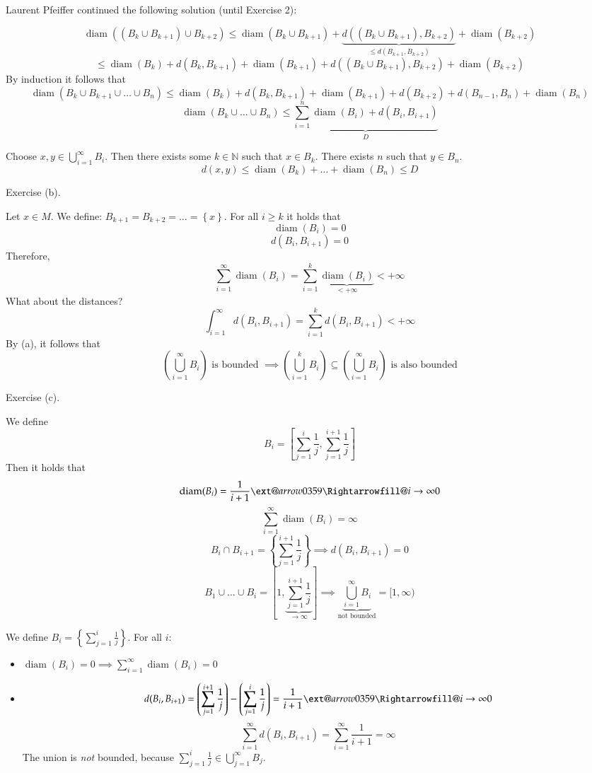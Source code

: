 \documentclass{article}
\makeatletter
\newcommand{\set}[1]{\left\{#1\right\}}
\newcommand{\xRightarrow}[2][]{\ext@arrow 0359\Rightarrowfill@{#1}{#2}}
\makeatother
\begin{document}
Laurent Pfeiffer continued the following solution (until Exercise 2):

\[ \operatorname{diam}((B_k \cup B_{k+1}) \cup B_{k+2}) \leq \operatorname{diam}(B_k \cup B_{k+1}) + \underbrace{d((B_k \cup B_{k+1}), B_{k+2})}_{\leq d(B_{k+1}, B_{k+2})} + \operatorname{diam}(B_{k+2}) \]
\[ \leq \operatorname{diam}(B_k) + d(B_k, B_{k+1}) + \operatorname{diam}(B_{k+1}) + d((B_k \cup B_{k+1}), B_{k+2}) + \operatorname{diam}(B_{k+2}) \]
By induction it follows that
\[ \operatorname{diam}(B_k \cup B_{k+1} \cup \dots \cup B_n) \leq \operatorname{diam}(B_k) + d(B_k, B_{k+1}) + \operatorname{diam}(B_{k+1})  + d(B_{k+2}) + d(B_{n-1}, B_n) + \operatorname{diam}(B_n) \]
\[ \operatorname{diam}(B_k \cup \dots \cup B_n) \leq \underbrace{\sum_{i=1}^n \operatorname{diam}(B_i) + d(B_i, B_{i+1})}_{D} \]

Choose $x,y \in \bigcup_{i=1}^\infty B_i$. Then there exists some $k \in \mathbb N$ such that $x \in B_k$. There exists $n$ such that $y \in B_n$.
\[ d(x,y) \leq \operatorname{diam}(B_k) + \dots + \operatorname{diam}(B_n) \leq D \]

Exercise (b).

Let $x \in M$. We define: $B_{k+1} = B_{k+2} = \dots = \set{x}$.
For all $i \geq k$ it holds that
\[ \operatorname{diam}(B_i) = 0 \]
\[ d(B_i, B_{i+1}) = 0 \]
Therefore,
\[ \sum_{i=1}^\infty \operatorname{diam}(B_i) = \sum_{i=1}^k \underbrace{\operatorname{diam}(B_i)}_{<+\infty} < +\infty \]
What about the distances?
\[ \int_{i=1}^\infty d(B_i, B_{i+1}) = \sum_{i=1}^k d(B_i, B_{i+1}) < +\infty \]
By (a), it follows that
\[ \left(\bigcup_{i=1}^\infty B_i\right) \text{ is bounded } \implies \left(\bigcup_{i=1}^k B_i\right) \subseteq \left(\bigcup_{i=1}^\infty B_i\right) \text{ is also bounded}  \]

Exercise (c).

We define
\[ B_i = \left[\sum_{j=1}^i \frac1j , \sum_{j=1}^{i+1} \frac1j\right] \]
Then it holds that
\[ \operatorname{diam}(B_i) = \frac1{i+1} \xRightarrow{i\to\infty} 0 \]
\[ \sum_{i=1}^\infty \operatorname{diam}(B_i) = \infty \]
\[ B_i \cap B_{i+1} = \set{\sum_{j=1}^{i+1} \frac1j} \implies d(B_i, B_{i+1}) = 0 \]
\[ B_1 \cup \dots \cup B_i = \left[1, \underbrace{\sum_{j=1}^{i+1} \frac1j}_{\to\infty}\right] \implies \underbrace{\bigcup_{i=1}^\infty B_i}_{\text{not bounded}} = [1,\infty) \]

We define $B_i = \set{\sum_{j=1}^i \frac1{j}}$. For all $i$:
\begin{itemize}
  \item $\operatorname{diam}(B_i) = 0 \implies \sum_{i=1}^\infty \operatorname{diam}(B_i) = 0$
  \item
    \[ d(B_i, B_{i+1}) = \left(\sum_{j=1}^{i+1} \frac1j\right) - \left(\sum_{j=1}^i \frac1j\right) = \frac1{i+1} \xRightarrow{i\to\infty} 0 \]
    \[ \sum_{i=1}^\infty d(B_i, B_{i+1}) = \sum_{i=1}^\infty \frac{1}{i+1} = \infty \]
    The union is \emph{not} bounded, because $\sum_{j=1}^i \frac1j \in \bigcup_{j=1}^\infty B_j$.
\end{itemize}
\end{document}
